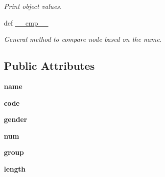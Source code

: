 \begin{DoxyCompactItemize}
\begin{DoxyCompactList}\small\item\em \-Print object values. \end{DoxyCompactList}\item 
def \hyperlink{classDavid2tulip_1_1Node_1_1Node_a4d46419de6f82ec9f948a00567777a3b}{\-\_\-\-\_\-cmp\-\_\-\-\_\-}
\begin{DoxyCompactList}\small\item\em \-General method to compare node based on the name. \end{DoxyCompactList}\end{DoxyCompactItemize}
\subsection*{\-Public \-Attributes}
\begin{DoxyCompactItemize}
\item 
\hypertarget{classDavid2tulip_1_1Node_1_1Node_a69402c28f03526c33177ba2c2d388e46}{
{\bfseries name}}
\label{classDavid2tulip_1_1Node_1_1Node_a69402c28f03526c33177ba2c2d388e46}

\item 
\hypertarget{classDavid2tulip_1_1Node_1_1Node_a508a8ffdec25ee7feb74d39c7c6650fc}{
{\bfseries code}}
\label{classDavid2tulip_1_1Node_1_1Node_a508a8ffdec25ee7feb74d39c7c6650fc}

\item 
\hypertarget{classDavid2tulip_1_1Node_1_1Node_aae3e82b9bc42b2a5c87da6b7d97fc662}{
{\bfseries gender}}
\label{classDavid2tulip_1_1Node_1_1Node_aae3e82b9bc42b2a5c87da6b7d97fc662}

\item 
\hypertarget{classDavid2tulip_1_1Node_1_1Node_a1e4160c740a7ef57147c8b443f3b8b59}{
{\bfseries num}}
\label{classDavid2tulip_1_1Node_1_1Node_a1e4160c740a7ef57147c8b443f3b8b59}

\item 
\hypertarget{classDavid2tulip_1_1Node_1_1Node_ad000944eaaed73953e9e1bb621fcb24c}{
{\bfseries group}}
\label{classDavid2tulip_1_1Node_1_1Node_ad000944eaaed73953e9e1bb621fcb24c}

\item 
\hypertarget{classDavid2tulip_1_1Node_1_1Node_a70a94a920dcc9c78531e3e76fedfc039}{
{\bfseries length}}
\label{classDavid2tulip_1_1Node_1_1Node_a70a94a920dcc9c78531e3e76fedfc039}

\end{DoxyCompactItemize}


